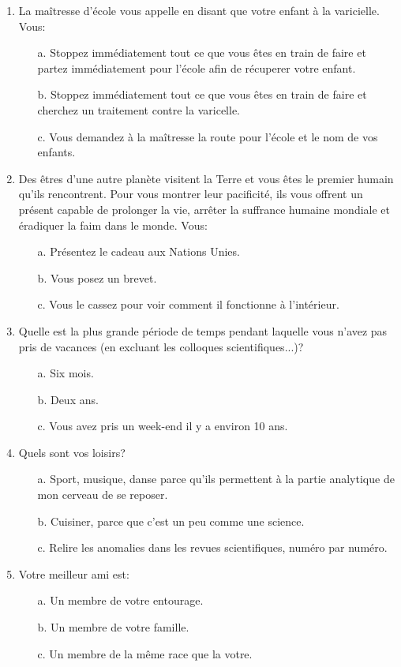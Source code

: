 \begin{enumerate}
	\item La maîtresse d'école vous appelle en disant que votre enfant à la varicielle. Vous:
	\begin{enumerate}
		\item[a.]  Stoppez immédiatement tout ce que vous êtes en train de faire et partez immédiatement pour l'école afin de récuperer votre enfant. 
		\item[b.] Stoppez immédiatement tout ce que vous êtes en train de faire et cherchez un traitement contre la varicelle.
		\item[c.] Vous demandez à la maîtresse la route pour l'école et le nom de vos enfants.
	\end{enumerate}

	\item Des êtres d'une autre planète visitent la Terre et vous êtes le premier humain qu'ils rencontrent. Pour vous montrer leur pacificité, ils vous offrent un présent capable de prolonger la vie, arrêter la suffrance humaine mondiale et éradiquer la faim dans le monde. Vous: 
	\begin{enumerate}
		\item[a.] Présentez le cadeau aux Nations Unies.
		\item[b.] Vous posez un brevet.
		\item[c.] Vous le cassez pour voir comment il fonctionne à l'intérieur.
	\end{enumerate}

	\item Quelle est la plus grande période de temps pendant laquelle vous n'avez pas pris de vacances (en excluant les colloques scientifiques...)? 
	\begin{enumerate}
		\item[a.] Six mois.
		\item[b.] Deux ans.
		\item[c.] Vous avez pris un week-end il y a environ 10 ans.
	\end{enumerate}

	\item Quels sont vos loisirs? 
	\begin{enumerate}
		\item[a.] Sport, musique, danse parce qu'ils permettent à la partie analytique de mon cerveau de se reposer.
		\item[b.] Cuisiner, parce que c'est un peu comme une science.
		\item[c.] Relire les anomalies dans les revues scientifiques, numéro par numéro. 
	\end{enumerate}

	\item Votre meilleur ami est: 
	\begin{enumerate}
		\item[a.] Un membre de votre entourage.
		\item[b.] Un membre de votre famille.
		\item[c.] Un membre de la même race que la votre.
	\end{enumerate}
\end{enumerate}

